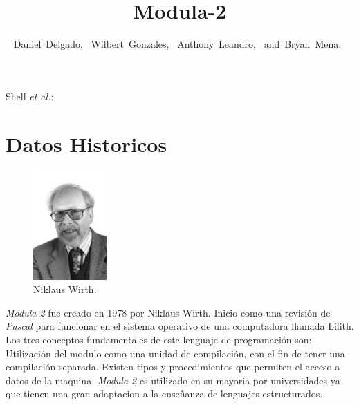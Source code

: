 \documentclass[10pt,journal,compsoc]{IEEEtran}
\begin{document}
\title{Modula-2}

\author{Daniel~Delgado,~
	Wilbert~Gonzales,~
	Anthony~Leandro,~
	and~Bryan~Mena,~
}
{Shell \MakeLowercase{\textit{et al.}}: \LaTex}


\maketitle

\IEEEdisplaynontitleabstractindextext

\IEEEpeerreviewmaketitle

\section{Datos Historicos}
\begin{figure}
	\centering
	\includegraphics[width=0.25\textwidth]{wirth.jpg}
	\caption{\label{fig:NiklausWirth}Niklaus Wirth.}
\end{figure}
\emph{Modula-2} fue creado en 1978 por Niklaus Wirth. Inicio como una revisi\'on de \emph{Pascal} para funcionar en el sistema operativo de una computadora llamada Lilith. Los tres conceptos fundamentales de este lenguaje de programaci\'on son:
Utilizaci\'on del modulo como una unidad de compilaci\'on, con el fin de tener una compilaci\'on separada.
Existen tipos y procedimientos que permiten el acceso a datos de la maquina. \emph{Modula-2} es utilizado en su mayoria por universidades ya que tienen una gran adaptacion a la ense\~nanza de lenguajes estructurados.
\end{document}
